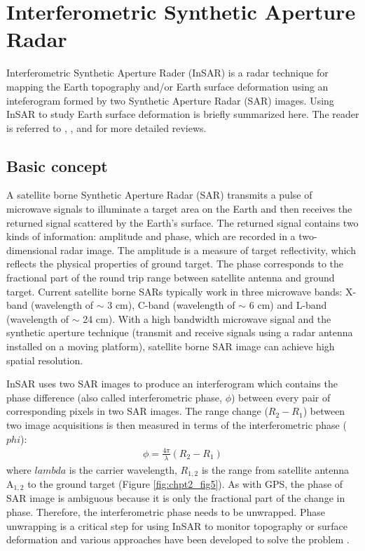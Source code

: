 \section{Interferometric Synthetic Aperture Radar}
Interferometric Synthetic Aperture Rader (InSAR) is a radar technique for mapping the Earth topography and/or Earth surface deformation using an inteferogram formed by two Synthetic Aperture Radar (SAR) images.  Using InSAR to study Earth surface deformation is briefly summarized here. The reader is referred to \citet{curlander1991chpt2}, \citet{massonnet1998chpt2}, \citet{rosen2000chpt2} and \citet{hanssen2001chpt2} for more detailed reviews.  

\subsection{Basic concept}
A satellite borne Synthetic Aperture Radar (SAR) transmits a pulse of microwave signals to illuminate a target area on the Earth and then receives the returned signal scattered by the Earth’s surface.  The returned signal contains two kinds of information: amplitude and phase, which are recorded in a two-dimensional radar image.  The amplitude is a measure of target reflectivity, which reflects the physical properties of ground target.  The phase corresponds to the fractional part of the round trip range between satellite antenna and ground target.  Current satellite borne SARs typically work in three microwave bands: X-band (wavelength of $\sim$ 3 cm), C-band (wavelength of $\sim$ 6 cm) and L-band (wavelength of $\sim$ 24 cm).  With a high bandwidth microwave signal and the synthetic aperture technique (transmit and receive signals using a radar antenna installed on a moving platform), satellite borne SAR image can achieve high spatial resolution. 

InSAR uses two SAR images to produce an interferogram which contains the phase difference (also called interferometric phase, $\phi$) between every pair of corresponding pixels in two SAR images.  The range change ($R_{2}-R_{1}$) between two image acquisitions is then measured in terms of the interferometric phase ($phi$): 
\begin{equation} \label{eq:chpt2_eq3}
\begin{aligned}
\phi=\frac{4 \pi}{\lambda}(R_{2}-R_{1})
\end{aligned}
\end{equation}
where $lambda$ is the carrier wavelength, $R_{1,2}$ is the range from satellite antenna A$_{1,2}$ to the ground target (Figure \ref{fig:chpt2_fig5}).  As with GPS, the phase of SAR image is ambiguous because it is only the fractional part of the change in phase.  Therefore, the interferometric phase needs to be unwrapped.  Phase unwrapping is a critical step for using InSAR to monitor topography or surface deformation and various approaches have been developed to solve the problem \cite[e.g.,][]{zebker1998chpt2}.  

